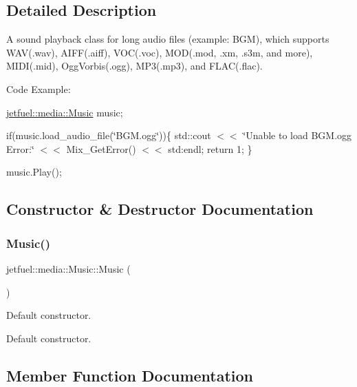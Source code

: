 \subsection{Detailed Description}
A sound playback class for long audio files (example\+: B\+GM), which supports W\+AV(.wav), A\+I\+FF(.aiff), V\+OC(.voc), M\+OD(.mod, .xm, .s3m, and more), M\+I\+DI(.mid), Ogg\+Vorbis(.ogg), M\+P3(.mp3), and F\+L\+AC(.flac).

Code Example\+:

\hyperlink{classjetfuel_1_1media_1_1Music}{jetfuel\+::media\+::\+Music} music;

if(music.\+load\+\_\+audio\+\_\+file(\char`\"{}\+B\+G\+M.\+ogg\char`\"{}))\{ std\+::cout $<$$<$ \char`\"{}\+Unable to load B\+G\+M.\+ogg Error\+:\char`\"{} $<$$<$ Mix\+\_\+\+Get\+Error() $<$$<$ std\+:endl; return 1; \}

music.\+Play(); 

\subsection{Constructor \& Destructor Documentation}
\mbox{\label{classjetfuel_1_1media_1_1Music_aa3adce621c89ea9915bd6d13648ac5de}} 
\subsubsection{\texorpdfstring{Music()}{Music()}}
{\footnotesize\ttfamily jetfuel\+::media\+::\+Music\+::\+Music (\begin{DoxyParamCaption}{ }\end{DoxyParamCaption})}



Default constructor. 

Default constructor. 

\subsection{Member Function Documentation}
\mbox{\label{classjetfuel_1_1media_1_1Music_a157b382df9640e2df504de9ed1beb031}} 
